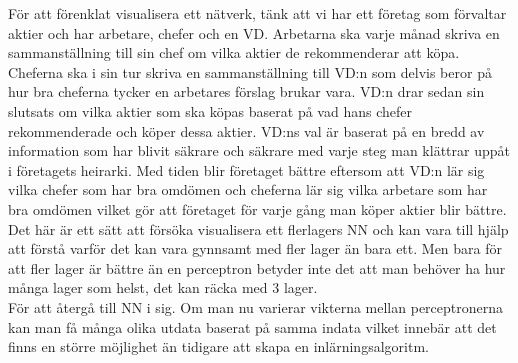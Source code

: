 \documentclass[a4paper,10pt]{article}
\begin{document}
För att förenklat visualisera ett nätverk, tänk att vi har ett företag som förvaltar aktier och har arbetare, chefer och en VD. Arbetarna ska varje månad skriva en sammanställning till sin chef om vilka aktier de rekommenderar att köpa. Cheferna ska i sin tur skriva en sammanställning till VD:n som delvis beror på hur bra cheferna tycker en arbetares förslag brukar vara. VD:n drar sedan sin slutsats om vilka aktier som ska köpas baserat på vad hans chefer rekommenderade och köper dessa aktier. VD:ns val är baserat på en bredd av information som har blivit säkrare och säkrare med varje steg man klättrar uppåt i företagets heirarki. Med tiden blir företaget bättre eftersom att VD:n lär sig vilka chefer som har bra omdömen och cheferna lär sig vilka arbetare som har bra omdömen vilket gör att företaget för varje gång man köper aktier blir bättre. Det här är ett sätt att försöka visualisera ett flerlagers NN och kan vara till hjälp att förstå varför det kan vara gynnsamt med fler lager än bara ett. Men bara för att fler lager är bättre än en perceptron betyder inte det att man behöver ha hur många lager som helst, det kan räcka med 3 lager. \autocite{StackExchange}
\\
För att återgå till NN i sig. Om man nu varierar vikterna mellan perceptronerna kan man få många olika utdata baserat på samma indata vilket innebär att det finns en större möjlighet än tidigare att skapa en inlärningsalgoritm. 
\end{document}
